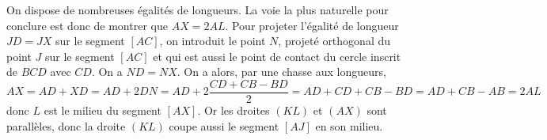 \begin{sol}
On dispose de nombreuses égalités de longueurs. La voie la plus naturelle pour conclure est donc de montrer que $AX=2AL$. Pour projeter l'égalité de longueur $JD=JX$ sur le segment $[AC]$, on introduit le point $N$, projeté orthogonal du point $J$ sur le segment $[AC]$ et qui est aussi le point de contact du cercle inscrit de $BCD$ avec $CD$. On a $ND=NX$.
On a alors, par une chasse aux longueurs,
$$AX=AD+XD=AD+2DN=AD+2\frac{CD+CB-BD}{2}=AD+CD+CB-BD=AD+CB-AB=2AL$$ donc $L$ est le milieu du segment $[AX]$. Or les droites $(KL)$ et $(AX)$ sont parallèles, donc la droite $(KL)$ coupe aussi le segment $[AJ]$ en son milieu.
\end{sol}